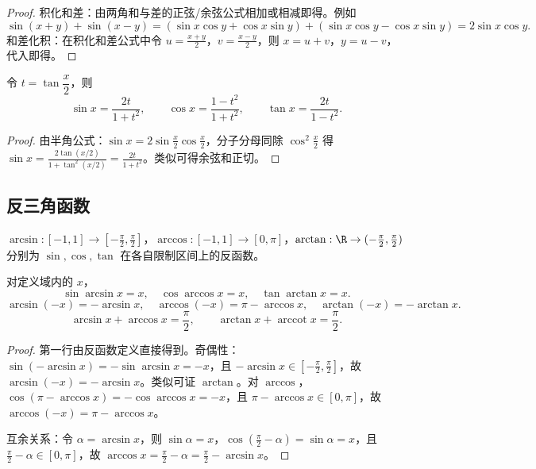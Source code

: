 \begin{proof}
	积化和差：由两角和与差的正弦/余弦公式相加或相减即得。例如
	\[
	\sin(x+y) + \sin(x-y) = (\sin x \cos y + \cos x \sin y) + (\sin x \cos y - \cos x \sin y) = 2\sin x \cos y.
	\]
	和差化积：在积化和差公式中令 $u = \frac{x+y}{2}$，$v = \frac{x-y}{2}$，则 $x = u+v$，$y = u-v$，代入即得。
\end{proof}


\begin{proposition}[万能公式]
	令 $t = \tan\dfrac{x}{2}$，则
	\[
	\sin x = \frac{2t}{1+t^2}, \qquad
	\cos x = \frac{1-t^2}{1+t^2}, \qquad
	\tan x = \frac{2t}{1-t^2}.
	\]
\end{proposition}

\begin{proof}
	由半角公式：$\sin x = 2\sin\frac{x}{2}\cos\frac{x}{2}$，分子分母同除 $\cos^2\frac{x}{2}$ 得 $\sin x = \frac{2\tan(x/2)}{1+\tan^2(x/2)} = \frac{2t}{1+t^2}$。类似可得余弦和正切。
\end{proof}

\subsection*{反三角函数}

\begin{definition}
	$\arcsin: [-1,1] \to [-\frac{\pi}{2}, \frac{\pi}{2}]$，$\arccos: [-1,1] \to [0,\pi]$，$\arctan: \R \to (-\frac{\pi}{2}, \frac{\pi}{2})$ 分别为 $\sin, \cos, \tan$ 在各自限制区间上的反函数。
\end{definition}

\begin{proposition}[基本恒等式]
	对定义域内的 $x$，
	\[
	\sin\arcsin x = x, \quad \cos\arccos x = x, \quad \tan\arctan x = x.
	\]
	\[
	\arcsin(-x) = -\arcsin x, \quad \arccos(-x) = \pi - \arccos x, \quad \arctan(-x) = -\arctan x.
	\]
	\[
	\arcsin x + \arccos x = \frac{\pi}{2}, \qquad \arctan x + \operatorname{arccot} x = \frac{\pi}{2}.
	\]
\end{proposition}

\begin{proof}
	第一行由反函数定义直接得到。奇偶性：$\sin(-\arcsin x) = -\sin\arcsin x = -x$，且 $-\arcsin x \in [-\frac{\pi}{2},\frac{\pi}{2}]$，故 $\arcsin(-x) = -\arcsin x$。类似可证 $\arctan$。对 $\arccos$，$\cos(\pi - \arccos x) = -\cos\arccos x = -x$，且 $\pi - \arccos x \in [0,\pi]$，故 $\arccos(-x) = \pi - \arccos x$。
	
	互余关系：令 $\alpha = \arcsin x$，则 $\sin\alpha = x$，$\cos(\frac{\pi}{2}-\alpha) = \sin\alpha = x$，且 $\frac{\pi}{2}-\alpha \in [0,\pi]$，故 $\arccos x = \frac{\pi}{2}-\alpha = \frac{\pi}{2} - \arcsin x$。
\end{proof}

